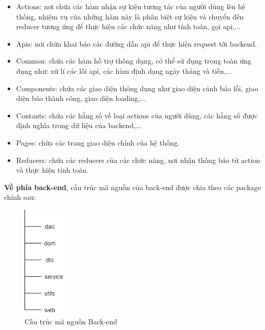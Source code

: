 \begin{itemize}
    \item Actions: nơi chứa các hàm nhận sự kiện tương tác của người dùng lên hệ thống, nhiệm vụ của những hàm này là phân biệt sự kiện và chuyển đến reducer tương ứng để thực hiện các chức năng như tính toán, gọi api,...
    \item Apis: nơi chứa khai báo các đường dẫn api để thực hiện request tới backend.
    \item Common: chứa các hàm hỗ trợ thông dụng, có thể sử dụng trong toàn ứng dụng như: xử lí các lỗi api, các hàm định dạng ngày tháng và tiền,...
    \item Components: chứa các giao diện thông dụng như giao diện cảnh báo lỗi, giao diện báo thành công, giao diện loading,...
    \item Contants: chứa các hằng số về loại actions của người dùng, các hằng số được định nghĩa trong dữ liệu của backend,...
    \item Pages: chứa các trang giao diện chính của hệ thống.
    \item Reducers: chứa các reducers của các chức năng, nơi nhận thông báo từ action và thực hiện tính toán.
\end{itemize}





\textbf{Về phía back-end}, cấu trúc mã nguồn của back-end được chia theo các package chính sau:
\begin{figure}[H]
    \begin{center}
        \includegraphics[width=2cm]{Image/Technical/backend_structure.png}
        \caption{Cấu trúc mã nguồn Back-end}
        \label{backend_structure}
    \end{center}
\end{figure}

